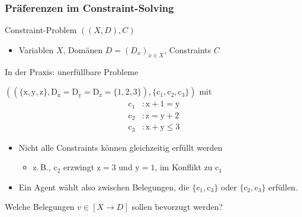 \documentclass[handout,10pt,xcolor={dvipsnames},fleqn]{beamer}
\newcommand{\cemph}[1]{\alert{#1}}
\begin{document}
\begin{frame}
\frametitle{Präferenzen im Constraint-Solving}

Constraint-Problem $((X, D), C)$
\begin{itemize}
  \item \cemph{Variablen} $X$,
\cemph{Domänen} $D = (D_x)_{x \in X}$,
\cemph{Constraints} $C$
\end{itemize}

\vspace*{1ex}

In der Praxis: \cemph{unerfüllbare} Probleme

\vspace*{2ex}

$((\{ \mathrm{x}, \mathrm{y}, \mathrm{z} \},
\mathrm{D}_{\mathrm{x}} = \mathrm{D}_{\mathrm{y}} =
\mathrm{D}_{\mathrm{z}} = \{ 1, 2, 3 \}), \{ \mathrm{c}_1,
\mathrm{c}_2, \mathrm{c}_3 \})$ mit
\bgroup{}
\begin{align*}
  \mathrm{c}_1 &: \mathrm{x} + 1 = \mathrm{y}
\\[-.4ex]
  \mathrm{c}_2 &: \mathrm{z} = \mathrm{y} + 2
\\[-.4ex]
  \mathrm{c}_3 &: \mathrm{x} + \mathrm{y} \leq 3
\end{align*}
\egroup

\begin{itemize}
  \item Nicht alle Constraints können gleichzeitig erfüllt werden
\begin{itemize}
  \item z.\,B., $\mathrm{c}_2$ erzwingt $\mathrm{z} = 3$ und $\mathrm{y} = 1$, im Konflikt zu $\mathrm{c}_1$
\end{itemize}

  \item Ein Agent wählt also zwischen Belegungen, die $\{ \mathrm{c}_1, \mathrm{c}_3 \}$ oder $\{ \mathrm{c}_2, \mathrm{c}_3 \}$ erfüllen.
\end{itemize}

\vspace*{2ex}

Welche Belegungen $v \in [X \to D]$ sollen \cemph{bevorzugt} werden?

\end{frame}
\end{document}
